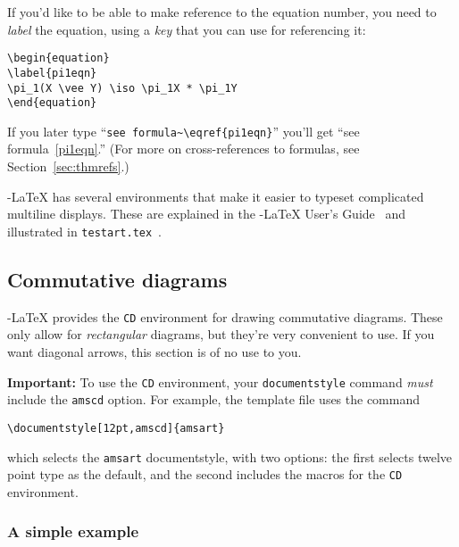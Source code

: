 If you'd like to be able to make reference to the equation number,
you need to {\em label\/} the equation, using a {\em key\/} that you
can use for referencing it:
%
\begin{verbatim}
\begin{equation}
\label{pi1eqn}
\pi_1(X \vee Y) \iso \pi_1X * \pi_1Y
\end{equation}
\end{verbatim}
%
If you later type ``\verb"see formula~\eqref{pi1eqn}"'' you'll get
``see formula~\eqref{pi1eqn}.''  (For more on cross-references to
formulas, see Section~\ref{sec:thmrefs}.)

\AmS-\LaTeX{} has several environments that make it easier to typeset
complicated multiline displays.  These are explained in the
\AmS-\LaTeX{} User's Guide~\cite[pages 26--30]{amslatexusersguide}
and illustrated in
\verb"testart.tex"~\cite[pages 30--42]{testart.tex}.



\subsection{Commutative diagrams}

\AmS-\LaTeX{} provides the \verb"CD" environment for drawing
commutative diagrams.  These only allow for {\em rectangular\/}
diagrams, but they're very convenient to use.  If you want diagonal
arrows, this section is of no use to you.

{\bf Important:} To use the \verb"CD" environment, your
\verb"documentstyle" command {\em must\/} include the \verb"amscd"
option.  For example, the template file uses the command
\begin{center}
\verb"\documentstyle[12pt,amscd]{amsart}"
\end{center}
which selects the \verb"amsart" documentstyle, with two options: the
first selects twelve point type as the default, and the second
includes the macros for the \verb"CD" environment.

\subsubsection*{A simple example}

